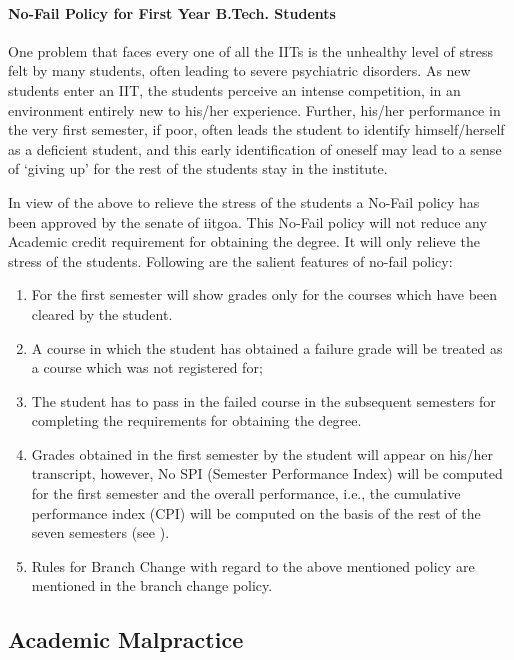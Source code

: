 \paragraph{No-Fail Policy for First Year B.Tech. Students} One problem that faces every one of all the IITs is the unhealthy level of stress felt by many \glspl{student}, often leading to severe psychiatric disorders. As new \glspl{student} enter an IIT, the \glspl{student} perceive an intense competition, in an environment entirely new to his/her experience. Further, his/her performance in the very first semester, if poor, often leads the \gls{student} to identify himself/herself as a deficient \gls{student}, and this early identification of oneself may lead to a sense of ‘giving up’ for the rest of the \glspl{student} stay in the \gls{institute}.

In view of the above to relieve the stress of the \glspl{student} a No-Fail policy has been approved by the \gls{senate} of \acrshort{iitgoa}. This No-Fail policy will not reduce any Academic credit requirement for obtaining the degree. It will only relieve the stress of the \glspl{student}. Following are the salient features of no-fail policy:

\begin{enumerate}[leftmargin=15mm, resume]
    \item For the first semester will show grades only for the courses which have been cleared by the \gls{student}.
    \item A course in which the \gls{student} has obtained a failure grade will be treated as a course which was not registered for;
    \item The \gls{student} has to pass in the failed course in the subsequent semesters for completing the requirements for obtaining the degree.
    \item Grades obtained in the first semester by the \gls{student} will appear on his/her transcript, however, No SPI (Semester Performance Index) will be computed for the first semester and the overall performance, i.e., the cumulative performance index (CPI) will be computed on the basis of the rest of the seven semesters (see ).
    \item Rules for Branch Change with regard to the above mentioned policy are mentioned in the branch change policy.
\end{enumerate}

\subsection{Academic Malpractice}

